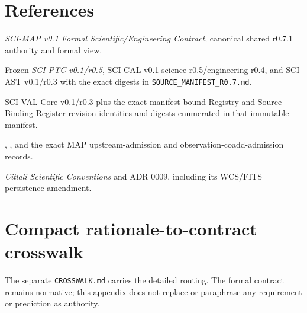 \documentclass[10pt]{article}
\newcommand{\code}[1]{\nolinkurl{#1}}
\begin{document}
\section*{References}
\begin{enumerate}[label={[\arabic*]},leftmargin=*]
\item \emph{SCI-MAP v0.1 Formal Scientific/Engineering Contract}, canonical shared r0.7.1 authority and formal view.
\item Frozen \emph{SCI-PTC v0.1/r0.5}, SCI-CAL v0.1 science r0.5/engineering r0.4, and SCI-AST v0.1/r0.3 with the exact digests in \code{SOURCE_MANIFEST_R0.7.md}.
\item SCI-VAL Core v0.1/r0.3 plus the exact manifest-bound Registry and Source-Binding Register revision identities and digests enumerated in that immutable manifest.
\item \SCIMapPTCMapBoundaryId,
\SCIMapASTFootprintBoundaryId, and the
exact MAP upstream-admission and observation-coadd-admission records.
\item \emph{Citlali Scientific Conventions} and ADR 0009, including its WCS/FITS persistence amendment.
\end{enumerate}

\clearpage\appendix
\section{Compact rationale-to-contract crosswalk}\label{app:crosswalk}
The separate \code{CROSSWALK.md} carries the detailed
routing. The formal contract remains normative; this appendix does not replace
or paraphrase any requirement or prediction as authority.
\end{document}
